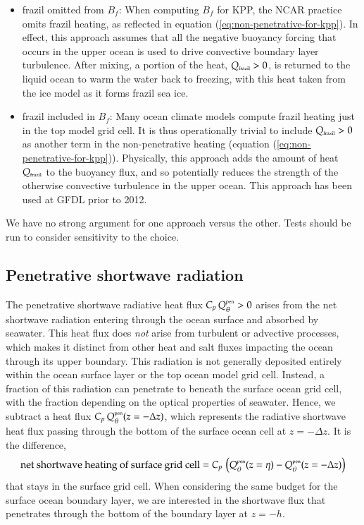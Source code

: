 \begin{itemize}

\item {\sc frazil omitted from $B_{f}$}: When computing $B_{f}$ for
  KPP, the NCAR practice omits frazil heating, as reflected in
  equation (\ref{eq:non-penetrative-for-kpp}).  In effect, this
  approach assumes that all the negative buoyancy forcing that occurs
  in the upper ocean is used to drive convective boundary layer
  turbulence. After mixing, a portion of the heat, $Q_{\mbox{\tiny
      frazil}} > 0$, is returned to the liquid ocean to warm the water
  back to freezing, with this heat taken from the ice model as it forms
  frazil sea ice.

\item {\sc frazil included in $B_{f}$}: Many ocean climate models
  compute frazil heating just in the top model grid cell.  It is thus
  operationally trivial to include $Q_{\mbox{\tiny frazil}} > 0$ as
  another term in the non-penetrative heating (equation
  (\ref{eq:non-penetrative-for-kpp})).  Physically, this approach adds
  the amount of heat $Q_{\mbox{\tiny frazil}}$ to the buoyancy flux,
  and so potentially reduces the strength of the otherwise convective
  turbulence in the upper ocean.  This approach has been used at GFDL
  prior to 2012.

\end{itemize}
We have no strong argument for one approach versus the other.  Tests
should be run to consider sensitivity to the choice.



\subsection{Penetrative shortwave radiation} 
\label{subsection:pen-buoyancy-fluxes}

The penetrative shortwave radiative heat flux $C_{p} \,
Q_{\theta}^{\mbox{\tiny pen}} > 0$ arises from the net shortwave
radiation entering through the ocean surface and absorbed by seawater.
This heat flux does {\it not} arise from turbulent or advective
processes, which makes it distinct from other heat and salt fluxes
impacting the ocean through its upper boundary.  This radiation is not
generally deposited entirely within the ocean surface layer or the top
ocean model grid cell. Instead, a fraction of this radiation can
penetrate to beneath the surface ocean grid cell, with the fraction
depending on the optical properties of seawater.  Hence, we subtract a
heat flux $C_{p} \, Q_{\theta}^{\mbox{\tiny pen}}(z=-\Delta z)$, which
represents the radiative shortwave heat flux passing through the
bottom of the surface ocean cell at $z=-\Delta z$.  It is the
difference,
\begin{equation}
   \mbox{net shortwave heating of surface grid cell} = 
  C_{p} \, \left( Q_{\theta}^{\mbox{\tiny pen}}(z=\eta) 
                    -Q_{\theta}^{\mbox{\tiny pen}}(z=-\Delta z) \right)
\end{equation}
that stays in the surface grid cell.  When considering the same budget
for the surface ocean boundary layer, we are interested in the
shortwave flux that penetrates through the bottom of the boundary
layer at $z=-h$.



